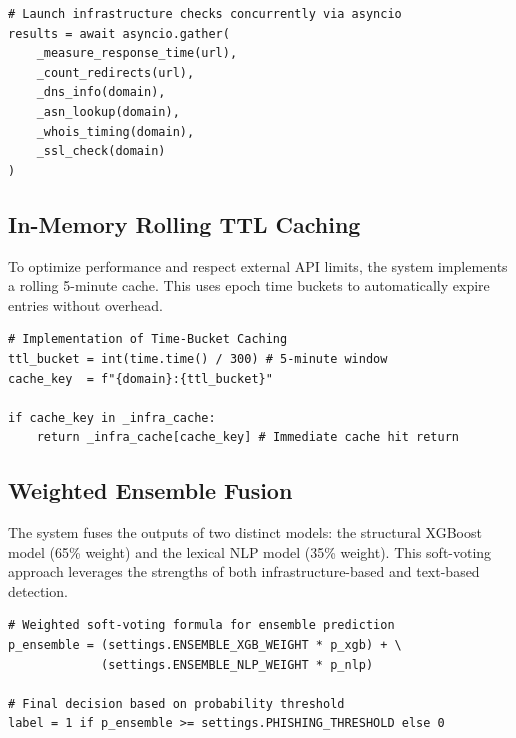 \begin{listing}[htbp]
\begin{verbatim}
# Launch infrastructure checks concurrently via asyncio
results = await asyncio.gather(
    _measure_response_time(url),
    _count_redirects(url),
    _dns_info(domain),
    _asn_lookup(domain),
    _whois_timing(domain),
    _ssl_check(domain)
)
\end{verbatim}
\caption{Concurrent Infrastructure Signal Extraction (deep\_feature\_extractor.py)}
\label{lst:concurrent_extraction}
\end{listing}

\subsection{In-Memory Rolling TTL Caching}
\noindent
To optimize performance and respect external API limits, the system implements a rolling 5-minute cache. This uses epoch time buckets to automatically expire entries without overhead.

\begin{listing}[htbp]
\begin{verbatim}
# Implementation of Time-Bucket Caching
ttl_bucket = int(time.time() / 300) # 5-minute window
cache_key  = f"{domain}:{ttl_bucket}"

if cache_key in _infra_cache:
    return _infra_cache[cache_key] # Immediate cache hit return
\end{verbatim}
\caption{Rolling Time-Bucket Caching Mechanism (deep\_feature\_extractor.py)}
\label{lst:ttl_caching}
\end{listing}

\subsection{Weighted Ensemble Fusion}
\noindent
The system fuses the outputs of two distinct models: the structural XGBoost model (65\% weight) and the lexical NLP model (35\% weight). This soft-voting approach leverages the strengths of both infrastructure-based and text-based detection.

\begin{listing}[htbp]
\begin{verbatim}
# Weighted soft-voting formula for ensemble prediction
p_ensemble = (settings.ENSEMBLE_XGB_WEIGHT * p_xgb) + \
             (settings.ENSEMBLE_NLP_WEIGHT * p_nlp)

# Final decision based on probability threshold
label = 1 if p_ensemble >= settings.PHISHING_THRESHOLD else 0
\end{verbatim}
\caption{Weighted Soft-Voting Ensemble Fusion (ensemble\_service.py)}
\label{lst:ensemble_fusion}
\end{listing}

